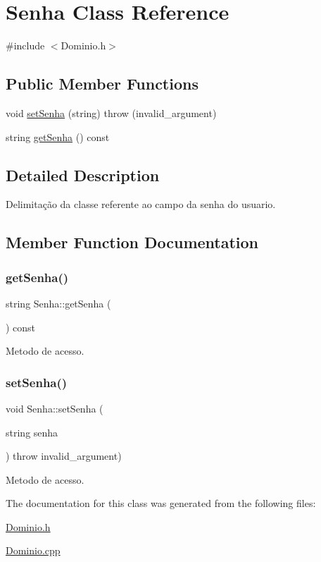 \hypertarget{class_senha}{}\section{Senha Class Reference}
\label{class_senha}


{\ttfamily \#include $<$Dominio.\+h$>$}

\subsection*{Public Member Functions}
\begin{DoxyCompactItemize}
\item 
void \hyperlink{class_senha_a735e4bf5f65cc8d28daa7dbf202fd999}{set\+Senha} (string)  throw (invalid\+\_\+argument)
\item 
string \hyperlink{class_senha_a1cc904431d0a8287d0b22dee3e9d34ae}{get\+Senha} () const
\end{DoxyCompactItemize}


\subsection{Detailed Description}
Delimitação da classe referente ao campo da senha do usuario. 

\subsection{Member Function Documentation}
\mbox{\label{class_senha_a1cc904431d0a8287d0b22dee3e9d34ae}} 
\subsubsection{\texorpdfstring{get\+Senha()}{getSenha()}}
{\footnotesize\ttfamily string Senha\+::get\+Senha (\begin{DoxyParamCaption}{ }\end{DoxyParamCaption}) const\hspace{0.3cm}{\ttfamily [inline]}}

Metodo de acesso. \mbox{\label{class_senha_a735e4bf5f65cc8d28daa7dbf202fd999}} 
\subsubsection{\texorpdfstring{set\+Senha()}{setSenha()}}
{\footnotesize\ttfamily void Senha\+::set\+Senha (\begin{DoxyParamCaption}\item[{string}]{senha }\end{DoxyParamCaption}) throw  invalid\+\_\+argument) }

Metodo de acesso. 

The documentation for this class was generated from the following files\+:\begin{DoxyCompactItemize}
\item 
\hyperlink{_dominio_8h}{Dominio.\+h}\item 
\hyperlink{_dominio_8cpp}{Dominio.\+cpp}\end{DoxyCompactItemize}

